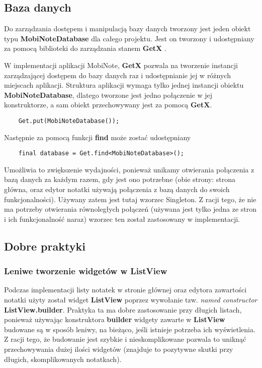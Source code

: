 \subsection{Baza danych}

Do zarządzania dostępem i manipulacją bazy danych tworzony jest jeden obiekt typu \textbf{MobiNoteDatabase} dla całego projektu. Jest on tworzony i udostępniany za pomocą biblioteki do zarządzania stanem \textbf{GetX} \cite{getx}. 

W implementacji aplikacji MobiNote, \textbf{GetX} pozwala na tworzenie instancji zarządzającej dostępem do bazy danych raz i udostępnianie jej w różnych miejscach aplikacji. Struktura aplikacji wymaga tylko jednej instancji obiektu \textbf{MobiNoteDatabase}, dlatego tworzone jest jedno połączenie w jej konstruktorze, a sam obiekt przechowywany jest za pomocą \textbf{GetX}.

\begin{verbatim}
    Get.put(MobiNoteDatabase());
\end{verbatim}

\noindent Następnie za pomocą funkcji \textbf{find} może zostać udostępniany

\begin{verbatim}
    final database = Get.find<MobiNoteDatabase>();
\end{verbatim}

Umożliwia to zwiększenie wydajności, ponieważ unikamy otwierania połączenia z bazą danych za każdym razem, gdy jest ono potrzebne (obie strony: strona główna, oraz edytor notatki używają połączenia z bazą danych do swoich funkcjonalności). Używany zatem jest tutaj wzorzec Singleton. Z racji tego, że nie ma potrzeby otwierania równoległych połączeń (używana jest tylko jedna ze stron i ich funkcjonalność naraz) wzorzec ten został zastosowany w implementacji.

\subsection{Dobre praktyki}

\subsubsection{Leniwe tworzenie widgetów w ListView}

Podczas implementacji listy notatek w stronie głównej oraz edytora zawartości notatki użyty został widget \textbf{ListView} poprzez wywołanie tzw. \textit{named constructor} \textbf{ListView.builder}\cite{listviewbuilder}. Praktyka ta ma dobre zastosowanie przy długich listach, ponieważ używając konstruktora \textbf{builder} widgety zawarte w \textbf{ListView} budowane są w sposób leniwy, na bieżąco, jeśli istnieje potrzeba ich wyświetlenia. Z racji tego, że budowanie jest szybkie i nieskomplikowane pozwala to uniknąć przechowywania dużej ilości widgetów (znajduje to pozytywne skutki przy długich, skomplikowanych notatkach).


